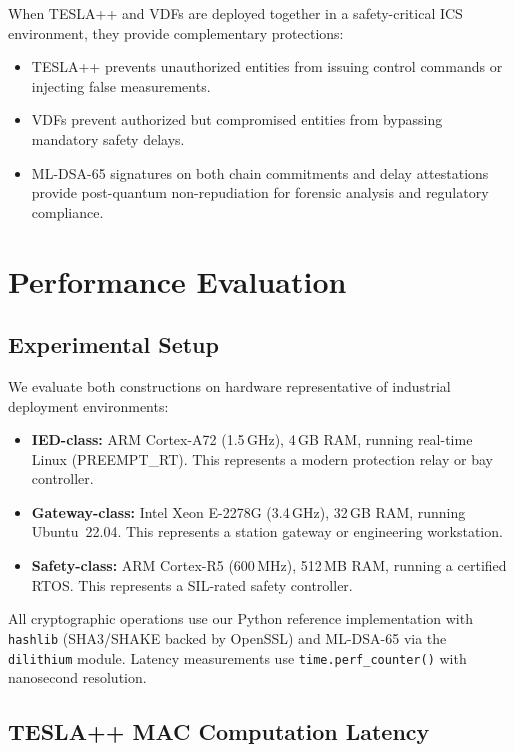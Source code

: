 \documentclass[conference,10pt]{IEEEtran}
\begin{document}
When TESLA++ and VDFs are deployed together in a safety-critical ICS environment, they provide complementary protections:
\begin{itemize}
  \item TESLA++ prevents unauthorized entities from issuing control commands or injecting false measurements.
  \item VDFs prevent authorized but compromised entities from bypassing mandatory safety delays.
  \item ML-DSA-65 signatures on both chain commitments and delay attestations provide post-quantum non-repudiation for forensic analysis and regulatory compliance.
\end{itemize}

\section{Performance Evaluation}
\label{sec:evaluation}

\subsection{Experimental Setup}

We evaluate both constructions on hardware representative of industrial deployment environments:

\begin{itemize}
  \item \textbf{IED-class:} ARM Cortex-A72 (1.5\,GHz), 4\,GB RAM, running real-time Linux (PREEMPT\_RT). This represents a modern protection relay or bay controller.
  \item \textbf{Gateway-class:} Intel Xeon E-2278G (3.4\,GHz), 32\,GB RAM, running Ubuntu~22.04. This represents a station gateway or engineering workstation.
  \item \textbf{Safety-class:} ARM Cortex-R5 (600\,MHz), 512\,MB RAM, running a certified RTOS. This represents a SIL-rated safety controller.
\end{itemize}

All cryptographic operations use our Python reference implementation with \texttt{hashlib} (SHA3/SHAKE backed by OpenSSL) and ML-DSA-65 via the \texttt{dilithium} module. Latency measurements use \texttt{time.perf\_counter()} with nanosecond resolution.

\subsection{TESLA++ MAC Computation Latency}
\end{document}
